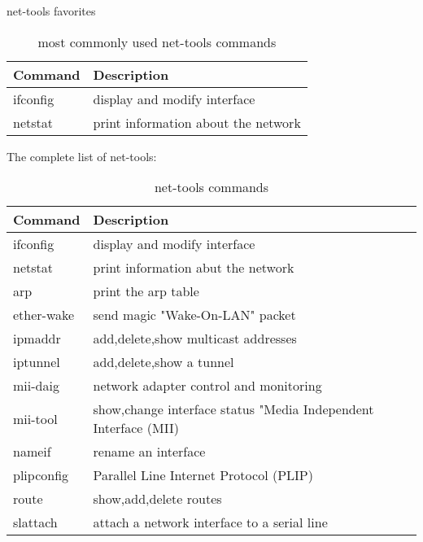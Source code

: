 \begin{frame}
   {net-tools favorites}


	\begin{longtable}{| m{5em} | m{20em} | }
		\caption{most commonly used net-tools commands} \\
		\hline  
		\textbf{Command}			&
		\textbf{Description} 			\\
		\hline 
		ifconfig				& 
		display and modify interface 		\\ 
		\hline
		netstat					&
		print information about the network 	\\ 
		\hline

	\end{longtable}


\end{frame}

\cprotect\note{
	
}

\begin{frame}
	{The complete list of net-tools:}

	\begin{longtable}{| m{5em} | m{30em} | }
                \caption{net-tools commands} \\
                \hline
                \textbf{Command}                        &
                \textbf{Description}                    \\
                \hline
                ifconfig                                &
                display and modify interface            \\
                \hline
                netstat                                 &
                print information abut the network      \\
                \hline
		arp					&
		print the arp table			\\
		\hline
		ether-wake				&
		send magic "Wake-On-LAN" packet		\\
		\hline
		ipmaddr					&
		add,delete,show multicast addresses 	\\
		\hline 
		iptunnel				&
		add,delete,show a tunnel		\\
		\hline
		mii-daig				&
		network adapter control and monitoring	\\
		\hline
		mii-tool				&
		show,change interface status "Media Independent Interface (MII)	\\
		\hline
		nameif					&
		rename an interface			\\
		\hline
		plipconfig				&
		Parallel Line Internet Protocol (PLIP) 	\\
		\hline
		route					&
		show,add,delete routes			\\
		\hline
		slattach				&
		attach a network interface to a serial line \\
		\hline

        \end{longtable}

\end{frame}

